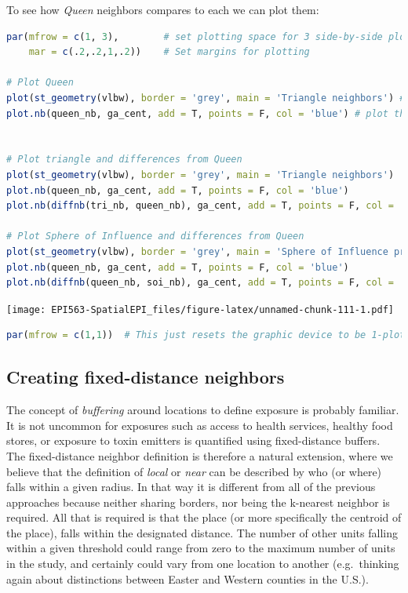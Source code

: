 \documentclass[
]{book}
\begin{document}
To see how \emph{Queen} neighbors compares to each we can plot them:

\begin{lstlisting}[language=R]
par(mfrow = c(1, 3),        # set plotting space for 3 side-by-side plots
    mar = c(.2,.2,1,.2))    # Set margins for plotting

# Plot Queen
plot(st_geometry(vlbw), border = 'grey', main = 'Triangle neighbors') # plot the polygons
plot.nb(queen_nb, ga_cent, add = T, points = F, col = 'blue') # plot the Queen neighbor links


# Plot triangle and differences from Queen
plot(st_geometry(vlbw), border = 'grey', main = 'Triangle neighbors') 
plot.nb(queen_nb, ga_cent, add = T, points = F, col = 'blue') 
plot.nb(diffnb(tri_nb, queen_nb), ga_cent, add = T, points = F, col = 'red') 

# Plot Sphere of Influence and differences from Queen
plot(st_geometry(vlbw), border = 'grey', main = 'Sphere of Influence pruning')
plot.nb(queen_nb, ga_cent, add = T, points = F, col = 'blue') 
plot.nb(diffnb(queen_nb, soi_nb), ga_cent, add = T, points = F, col = 'red') 
\end{lstlisting}

\texttt{[image: EPI563-SpatialEPI\_files/figure-latex/unnamed-chunk-111-1.pdf]}

\begin{lstlisting}[language=R]
par(mfrow = c(1,1))  # This just resets the graphic device to be 1-plot per page
\end{lstlisting}

\hypertarget{creating-fixed-distance-neighbors}{%
\subsection{Creating fixed-distance neighbors}\label{creating-fixed-distance-neighbors}}

The concept of \emph{buffering} around locations to define exposure is probably familiar. It is not uncommon for exposures such as access to health services, healthy food stores, or exposure to toxin emitters is quantified using fixed-distance buffers. The fixed-distance neighbor definition is therefore a natural extension, where we believe that the definition of \emph{local} or \emph{near} can be described by who (or where) falls within a given radius. In that way it is different from all of the previous approaches because neither sharing borders, nor being the k-nearest neighbor is required. All that is required is that the place (or more specifically the centroid of the place), falls within the designated distance. The number of other units falling within a given threshold could range from zero to the maximum number of units in the study, and certainly could vary from one location to another (e.g.~thinking again about distinctions between Easter and Western counties in the U.S.).
\end{document}
